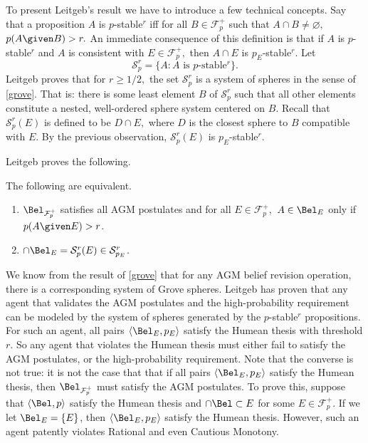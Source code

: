 To present Leitgeb's result we have to introduce a few technical concepts. Say
that a proposition $A$ is $p$-stable$^r$ iff for all $B\in \mathcal{F}_p^+$ such
that $A\cap B\neq \varnothing,$ $p(A \given B)>r.$ An immediate consequence of
this definition is that if $A$ is $p$-stable$^r$ and $A$ is consistent with
$E\in\mathcal{F}_p^+,$ then $A\cap E$ is $p_E$-stable$^r$. Let $$\mathcal{S}_p^r
= \{ A : A \text{ is $p$-stable$^r$} \}.$$ Leitgeb proves that for $r\geq 1/2,$
the set $\mathcal{S}_p^r$ is a system of spheres in the sense of
\autoref{grove}.  That is: there is some least element $B$ of $\mathcal{S}_p^r$
such that all other elements constitute a nested, well-ordered sphere system
centered on $B$. Recall that $\mathcal{S}_p^r(E)$ is defined to be $D\cap E,$
where $D$ is the closest sphere to $B$ compatible with $E$. By the previous
observation,  $\mathcal{S}_p^r(E)$ is $p_E$-stable$^r$. 

Leitgeb proves the following.
\begin{theorem}
  The following are equivalent.
  \begin{enumerate}
  \item $\Bel_{\mathcal{F}_p^+}$ satisfies all AGM postulates and for all
  $E\in\mathcal{F}_p^+,$ $A\in \Bel_E$ only if $p(A \given E)>r$.
  \item $\cap \Bel_E = \mathcal{S}_p^r(E)\in \mathcal{S}_{p_E}^r$. 
  \end{enumerate}
\end{theorem}
We know from the result of \autoref{grove} that for any AGM belief revision
operation, there is a corresponding system of Grove spheres. Leitgeb has proven
that any agent that validates the AGM postulates and the high-probability
requirement can be modeled by the system of spheres generated by the
$p$-stable$^r$ propositions. For such an agent, all pairs $\langle \Bel_E, p_E
\rangle$ satisfy the Humean thesis with threshold $r$. So any agent that
violates the Humean thesis must either fail to satisfy the AGM postulates, or
the high-probability requirement. Note that the converse is not true: it is not
the case that that if all pairs $\langle \Bel_E, p_E \rangle$ satisfy the Humean
thesis, then $\Bel_{\mathcal{F}_p^+}$ must satisfy the AGM postulates. To prove
this, suppose that $\langle \Bel, p \rangle$ satisfy the Humean thesis and $\cap
\Bel \subset E$  for some $E\in\mathcal{F}_p^+.$ If we let $\Bel_E = \{E\}$,
then  $\langle \Bel_E, p_E  \rangle$ satisfy the Humean thesis. However, such an
agent patently violates Rational and even Cautious Monotony.

